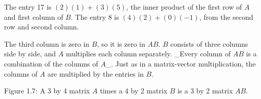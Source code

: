 The entry 17 is \((2)(1)+(3)(5)\), the inner product of the first row of \(A\) and first column of \(B\). The entry 8 is \((4)(2)+(0)(-1)\), from the second row and second column.

The third column is zero in \(B\), so it is zero in \(AB\). \(B\) consists of three columns side by side, and \(A\) multiplies each column separately. _Every column of \(AB\) is a combination of the columns of \(A\)_. Just as in a matrix-vector multiplication, the columns of \(A\) are multiplied by the entries in \(B\).

Figure 1.7: A 3 by 4 matrix \(A\) times a 4 by 2 matrix \(B\) is a 3 by 2 matrix \(AB\).

 